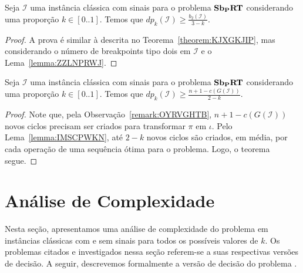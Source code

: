 \begin{theorem}\label{theorem:ABGZQHIL}
Seja $\mathcal{I}$ uma instância clássica com sinais para o problema $\textbf{Sb\textsubscript{P}RT}{}$ considerando uma proporção $k \in [0..1]$. Temos que $dp_{k}(\mathcal{I}) \ge \frac{b_2(\mathcal{I})}{3-k}$.
\end{theorem}
\begin{proof}
A prova é similar à descrita no Teorema~\ref{theorem:KJXGKJIP}, mas considerando o número de breakpoints tipo dois em $\mathcal{I}$ e o Lema~\ref{lemma:ZZLNPRWJ}.
\end{proof}

\begin{theorem}\label{theorem:WSTPPSMD}
Seja $\mathcal{I}$ uma instância clássica com sinais para o problema $\textbf{Sb\textsubscript{P}RT}{}$ considerando uma proporção $k \in [0..1]$. Temos que $dp_{k}(\mathcal{I}) \ge \frac{n + 1 - c(G(\mathcal{I}))}{2-k}$.
\end{theorem}
\begin{proof}
Note que, pela Observação~\ref{remark:OYRVGHTB}, $n+1 - c(G(\mathcal{I}))$ novos ciclos precisam ser criados para transformar $\pi$ em $\iota$. Pelo Lema~\ref{lemma:IMSCPWKN}, até $2-k$ novos ciclos são criados, em média, por cada operação de uma sequência ótima para o problema. Logo, o teorema segue.
\end{proof}

\section{Análise de Complexidade}

Nesta seção, apresentamos uma análise de complexidade do problema \SbPRT{} em instâncias clássicas com e sem sinais para todos os possíveis valores de $k$. Os problemas citados e investigados nessa seção referem-se a suas respectivas versões de decisão. A seguir, descrevemos formalmente a versão de decisão do problema \SbPRT{}.

\begin{decision}
\end{decision}

